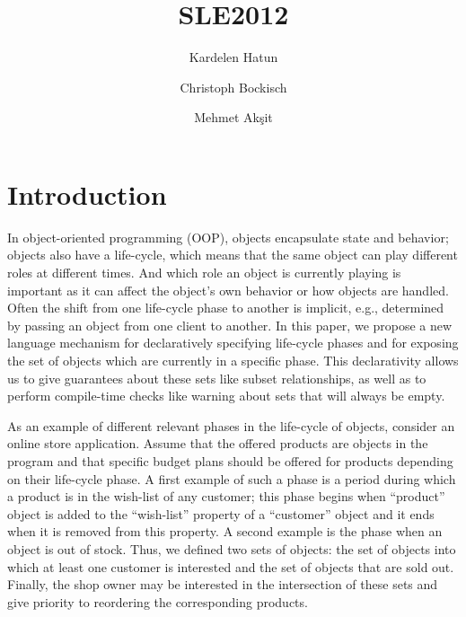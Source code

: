 \documentclass{llncs}
\begin{document}

\title{SLE2012}

\author{Kardelen Hatun \and Christoph Bockisch \and Mehmet Ak\c{s}it}

\maketitle

\section{Introduction}
In object-oriented programming (OOP), objects encapsulate state and behavior; objects also have a life-cycle, which means that the same object can play different roles at different times. And which role an object is currently playing is important as it can affect the object's own behavior or how objects are handled. Often the shift from one life-cycle phase to another is implicit, e.g., determined by passing an object from one client to another. In this paper, we propose a new language mechanism for declaratively specifying life-cycle phases and for exposing the set of objects which are currently in a specific phase. This declarativity allows us to give guarantees about these sets like subset relationships, as well as to perform compile-time checks like warning about sets that will always be empty.

As an example of different relevant phases in the life-cycle of objects, consider an online store application. Assume that the offered products are objects in the program and that specific budget plans should be offered for products depending on their life-cycle phase. A first example of such a phase is a period during which a product is in the wish-list of any customer; this phase begins when ``product'' object is added to the ``wish-list'' property of a ``customer'' object and it ends when it is removed from this property. A second example is the phase when an object is out of stock. Thus, we defined two sets of objects: the set of objects into which at least one customer is interested and the set of objects that are sold out. Finally, the shop owner may be interested in the intersection of these sets and give priority to reordering the corresponding products.
\end{document}
